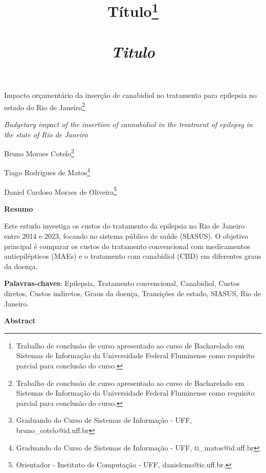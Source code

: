 \documentclass[article,a4paper,12pt,brazil,sumario=tradicional]{abntex2}
\title{ {\Large Título\footnote{Trabalho de conclusão de curso apresentado ao curso de Bacharelado em Sistemas de Informação da Universidade Federal Fluminense como requisito parcial para conclusão do curso.}\\\\
\vspace{.2} 
\textit{Titulo}\\}}
\date{ }
\begin{document}
\textual

\begin{center}
{\Large Impacto orçamentário da inserção de canabidiol no tratamento para epilepsia no estado do Rio de Janeiro\footnote{Trabalho de conclusão de curso apresentado ao curso de Bacharelado em Sistemas de Informação da Universidade Federal Fluminense como requisito parcial para conclusão do curso.}

\textit{Budgetary impact of the insertion of cannabidiol in the treatment of epilepsy in the state of Rio de Janeiro}\\}
\end{center}
\vspace{.2cm} 

\begin{flushright}
Bruno Moraes Cotelo\footnote{Graduando do Curso de Sistemas de Informação - UFF, bruno\_cotelo@id.uff.br}

Tiago Rodrigues de Matos\footnote{Graduando do Curso de Sistemas de Informação - UFF, ti\_matos@id.uff.br}

Daniel Cardoso Moraes de Oliveira\footnote{Orientador - Instituto de Computação - UFF, danielcmo@ic.uff.br.} 

\end{flushright}

\vspace{\onelineskip}

\begin{center}
    \textbf{Resumo}
\end{center}

\vspace{-.3cm}

\noindent Este estudo investiga os custos do tratamento da epilepsia no Rio de Janeiro entre 2014 e 2023, focando no sistema público de saúde (SIASUS). O objetivo principal é comparar os custos do tratamento convencional com medicamentos antiepilépticos (MAEs) e o tratamento com canabidiol (CBD) em diferentes graus da doença.

\vspace{.4cm}
 
\noindent
\textbf{Palavras-chaves}: Epilepsia, Tratamento convencional, Canabidiol, Custos diretos, Custos indiretos, Graus da doença, Transições de estado, SIASUS, Rio de Janeiro.
 
\vspace{\onelineskip}

\begin{center}
    \textbf{Abstract}
\end{center}
\end{document}

